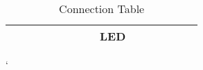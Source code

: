 \documentclass[journal,12pt,twocolumn]{IEEEtran}
\begin{document}
\begin{tableofcontents}
{\begin{table}[h]
{\begin{tabular}{|l|llll|llll|ll|llll|}
             & \multicolumn{1}{l|}{} & \multicolumn{1}{l|}{} & \multicolumn{1}{l|}{} &    & \multicolumn{1}{l|}{}  & \multicolumn{1}{l|}{}   & \multicolumn{1}{l|}{}  & LED  & \multicolumn{1}{l|}{}     &     & \multicolumn{1}{l|}{}  & \multicolumn{1}{l|}{}  & \multicolumn{1}{l|}{}   &    \\ \hline
\end{tabular}
}

 \vspace{3mm}
  \caption{Connection Table}
\label{table:4}
  `\end{table}
}
   \end{tableofcontents}
\end{document}
